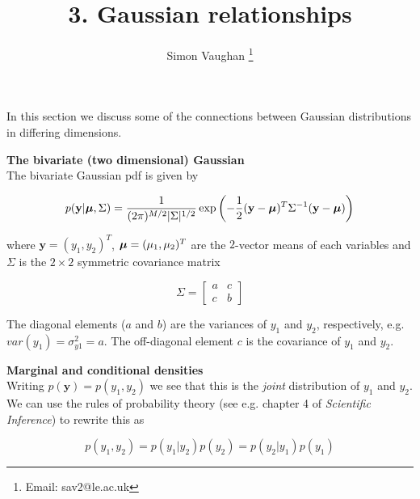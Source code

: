\documentclass[a4paper, 11pt, amsmath, graphicx]{article}\usepackage[]{graphicx}\usepackage[]{color}
\def\bmu{{\mbox{\boldmath $\mu$}}}
\begin{document}
\title{3. Gaussian relationships}
\author{Simon Vaughan \thanks{Email: sav2@le.ac.uk}}
\maketitle

In this section we discuss some of the connections between Gaussian distributions in differing dimensions.

\vspace{0.4cm}
\textbf{The bivariate (two dimensional) Gaussian}
\\

The bivariate Gaussian pdf is given by 

\begin{equation}
\label{eqn:bi}
  p(\mathbf{y}|\bmu, \Sigma) = \frac{1}{ (2 \pi)^{M/2} |\Sigma|^{1/2} } 
                 \exp \left( -\frac{1}{2} (\mathbf{y} - \bmu)^T
                 \Sigma^{-1} (\mathbf{y} - \bmu) \right)
\end{equation}

where $\mathbf{y} = (y_1, y_2)^T$, $\bmu = (\mu_1, \mu_2)^T$ are the $2$-vector means of each variables and $\Sigma$ is the $2 \times 2$ symmetric covariance matrix

\begin{equation}
  \Sigma = \left[ \begin{matrix}
 a & c \\
 c & b 
 \end{matrix} \right]
\end{equation}

The diagonal elements ($a$ and $b$) are the variances of $y_1$ and $y_2$, respectively, e.g. $var(y_1) = \sigma_{y1}^2 = a$. The off-diagonal element $c$ is the covariance of $y_1$ and $y_2$.

\vspace{0.4cm}
\textbf{Marginal and conditional densities}
\\

Writing $p(\mathbf{y}) = p(y_1, y_2)$ we see that this is the \emph{joint} distribution of $y_1$ and $y_2$. We can use the rules of probability theory (see e.g. chapter 4 of \emph{Scientific Inference}) to rewrite this as

\begin{equation}
\label{eqn:marg0}
  p(y_1, y_2) = p(y_1 | y_2) p(y_2) = p(y_2 | y_1) p(y_1)
\end{equation}
\end{document}
